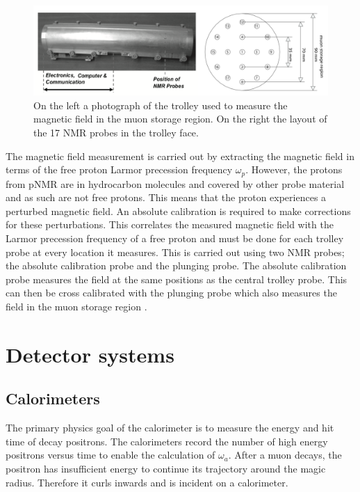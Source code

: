 \begin{figure}[th]
\centering
\includegraphics[scale=0.6]{Figures/trolleypic}
\decoRule
\caption{On the left a photograph of the trolley used to measure the magnetic field in the muon storage region. On the right the layout of the 17 NMR probes in the trolley face.}
\label{fig:trolleypic}
\end{figure}

The magnetic field measurement is carried out by extracting the magnetic field in terms of the free proton Larmor precession frequency $\omega{_p}$. However, the protons from pNMR are in hydrocarbon molecules and covered by other probe material and as such are not free protons. This means that the proton experiences a perturbed magnetic field. An absolute calibration is required to make corrections for these perturbations. This correlates the measured magnetic field with the Larmor precession frequency of a free proton and must be done for each trolley probe at every location it measures. This is carried out using two NMR probes; the absolute calibration probe and the plunging probe. The absolute calibration probe measures the field at the same positions as the central trolley probe. This can then be cross calibrated with the plunging probe which also measures the field in the muon storage region \cite{Reference22}.

\section{Detector systems}

\subsection{Calorimeters}

The primary physics goal of the calorimeter is to measure the energy and hit time of decay positrons. The calorimeters record the number of high energy positrons versus time to enable the calculation of $\omega_{a}$. After a muon decays, the positron has insufficient energy to continue its trajectory around the magic radius. Therefore it curls inwards and is incident on a calorimeter.

